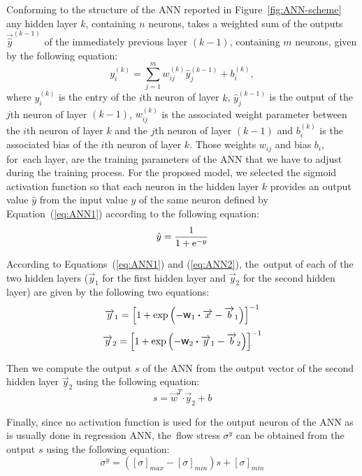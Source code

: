 \documentclass[algorithms,article,accept,pdftex,moreauthors]{Definitions/mdpi}
\DeclareRobustCommand{\w}{\mbox{\large\ensuremath{\mathsf{w}}}}
\DeclareRobustCommand{\dotp}{\boldsymbol{\cdot}}
\DeclareRobustCommand{\e}[1]{{\rm e}^{#1}}
\DeclareRobustCommand{\lay}[1]{^{(#1)}}
\begin{document}
Conforming to the structure of the ANN reported in Figure~\ref{fig:ANN-scheme} any hidden layer $k$, containing $n$ neurons, takes a weighted sum of the outputs $\overrightarrow{\hat{y}}^{(k-1)}$ of the immediately previous layer $(k-1)$, containing $m$ neurons, given by the following equation:
\begin{equation}
y_i\lay{k} = \sum_{j=1}^m w_{ij}\lay{k} \hat{y}_j^{(k-1)}+ b_i\lay{k},\label{eq:ANN1}
\end{equation}
where $y_i\lay{k}$ is the entry of the $i$th neuron of layer $k$, $\hat{y}_j\lay{k-1}$ is the output of the $j$th neuron of layer $(k-1)$, $w_{ij}\lay{k}$ is the associated weight parameter between the $i$th neuron of layer $k$ and the $j$th neuron of layer $(k-1)$ and $b_i\lay{k}$ is the associated bias of the $i$th neuron of layer $k$.
Those weights $w_{ij}$ and bias $b_i$, for~each layer, are the training parameters of the ANN that we have to adjust during the training process.
For the proposed model, we selected the sigmoid activation function so that each neuron in the hidden layer $k$ provides an output value ${\hat{y}}$ from the input value $y$ of the same neuron defined by Equation~(\ref{eq:ANN1}) according to the following equation:
\begin{equation}
\hat{y}=\frac{1}{1 + \e{-y}}\label{eq:ANN2}
\end{equation}

According to Equations~(\ref{eq:ANN1}) and (\ref{eq:ANN2}), the~output of each of the two hidden layers ($\overrightarrow{y}_1$ for the first hidden layer and $\overrightarrow{y}_2$ for the second hidden layer) are given by the following two equations:
\begin{equation}
\overrightarrow{y}_1 = \left[1 + \exp{\left(- \w_1 \dotp \overrightarrow{x}- \overrightarrow{b}_1\right)}\right]^{-1}\label{eq:ANN3}
\end{equation}
\begin{equation}
\overrightarrow{y}_2 = \left[1 + \exp{\left(- \w_2 \dotp \overrightarrow{y}_1- \overrightarrow{b}_2\right)}\right]^{-1}\label{eq:ANN4}
\end{equation}

Then we compute the output $s$ of the ANN from the output vector of the second hidden layer $\overrightarrow{y}_2$ using the following equation:
\begin{equation}
s = \overrightarrow{w}^T \dotp \overrightarrow{y}_2 + b\label{eq:ANN5}
\end{equation}

Finally, since no activation function is used for the output neuron of the ANN as is usually done in regression ANN, the~flow stress $\sigma^y$ can be obtained from the output $s$ using the following equation:
\begin{equation}
\sigma^y =  \left([\sigma]_{max}-[\sigma]_{min}\right)s + [\sigma]_{min} \label{eq:CR2}
\end{equation}
\end{document}
